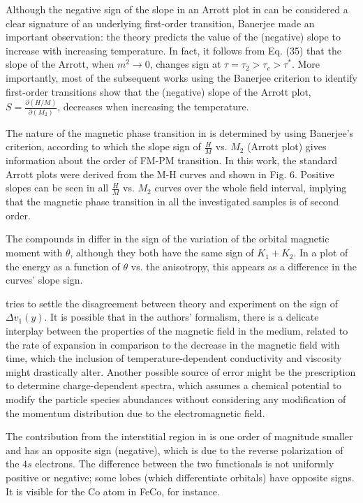 \documentclass[11pt]{book}
\begin{document}
Although the negative sign of the slope in an Arrott plot in \cite{bustingorry2016second}
can be considered a clear signature of an underlying first-order transition,
Banerjee made an important observation: the theory predicts the value
of the (negative) slope to increase with increasing temperature. In
fact, it follows from Eq. (35) that the slope of the Arrott, when
$m^{2}\rightarrow0$, changes sign at $\tau=\tau_{2}>\tau_{c}>\tau^{\ast}$.
More importantly, most of the subsequent works using the Banerjee
criterion to identify first-order transitions show that the (negative)
slope of the Arrott plot, $S=\frac{\partial\left(H/M\right)}{\partial\left(M_{2}\right)}$,
decreases when increasing the temperature.

The nature of the magnetic phase transition in \cite{hussain2017magnetocaloric}
is determined by using Banerjee's criterion, according to which the
slope sign of $\frac{H}{M}$ vs. $M_{2}$ (Arrott plot) gives information
about the order of FM-PM transition. In this work, the standard Arrott
plots were derived from the M-H curves and shown in Fig. 6. Positive
slopes can be seen in all $\frac{H}{M}$ vs. $M_{2}$ curves over
the whole field interval, implying that the magnetic phase transition
in all the investigated samples is of second order.

The compounds in \cite{edstrom2017magnetocrystalline} differ in the
sign of the variation of the orbital magnetic moment with $\theta$,
although they both have the same sign of $K_{1}+K_{2}$. In a plot
of the energy as a function of $\theta$ vs. the anisotropy, this
appears as a difference in the curves' slope sign.

\cite{inghirami2020magnetic} tries to settle the disagreement between
theory and experiment on the sign of $\Delta v_{1}\left(y\right)$.
It is possible that in the authors' formalism, there is a delicate
interplay between the properties of the magnetic field in the medium,
related to the rate of expansion in comparison to the decrease in
the magnetic field with time, which the inclusion of temperature-dependent
conductivity and viscosity might drastically alter. Another possible
source of error might be the prescription to determine charge-dependent
spectra, which assumes a chemical potential to modify the particle
species abundances without considering any modification of the momentum
distribution due to the electromagnetic field.

The contribution from the interstitial region in \cite{tran2020shortcomings}
is one order of magnitude smaller and has an opposite sign (negative),
which is due to the reverse polarization of the $4s$ electrons. The
difference between the two functionals is not uniformly positive or
negative; some lobes (which differentiate orbitals) have opposite
signs. It is visible for the Co atom in FeCo, for instance.
\end{document}
